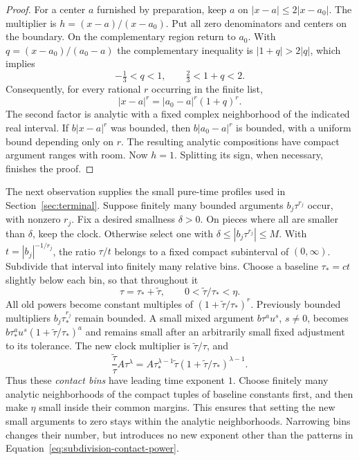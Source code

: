 \begin{proof}
For a center $a$ furnished by preparation, keep $a$ on
$|x-a|\le2|x-a_0|$.  The multiplier is
$h=(x-a)/(x-a_0)$.  Put all zero denominators and centers on the
boundary.  On the complementary region return to $a_0$.  With
$q=(x-a_0)/(a_0-a)$ the complementary inequality is
$|1+q|>2|q|$, which implies
\[
 -\tfrac13<q<1,\qquad \tfrac23<1+q<2.
\]
Consequently, for every rational $r$ occurring in the finite list,
\[
 |x-a|^r=|a_0-a|^r(1+q)^r.
\]
The second factor is analytic with a fixed complex neighborhood of the
indicated real interval.  If $b|x-a|^r$ was bounded, then
$b|a_0-a|^r$ is bounded, with a uniform bound depending only on $r$.
The resulting analytic compositions have compact argument ranges with
room.  Now $h=1$.  Splitting its sign, when necessary, finishes the proof.
\end{proof}

The next observation supplies the small pure-time profiles used in
Section~\ref{sec:terminal}.  Suppose finitely many bounded arguments
$b_j\tau^{r_j}$ occur, with nonzero $r_j$.  Fix a desired smallness
$\delta>0$.  On pieces where all are smaller than $\delta$, keep the
clock.  Otherwise select one with
$\delta\le|b_j\tau^{r_j}|\le M$.  With
$t=|b_j|^{-1/r_j}$, the ratio $\tau/t$ belongs to a fixed compact
subinterval of $(0,\infty)$.  Subdivide that interval into finitely many
relative bins.  Choose a baseline $\tau_*=ct$ slightly below each bin,
so that throughout it
\[
 \tau=\tau_*+\widetilde\tau,\qquad
 0<\widetilde\tau/\tau_*<\eta.
\]
All old powers become constant multiples of
$(1+\widetilde\tau/\tau_*)^r$.
Previously bounded multipliers $b_j\tau_*^{r_j}$ remain bounded.
A small mixed argument $b\tau^a u^s$, $s\ne0$, becomes
$b\tau_*^a u^s(1+\widetilde\tau/\tau_*)^a$ and remains small after
an arbitrarily small fixed adjustment to its tolerance.  The new clock
multiplier is $\widetilde\tau/\tau$, and
\begin{equation}
\label{eq:subdivision-contact-power}
 \frac{\widetilde\tau}{\tau}A\tau^\lambda
 =A\tau_*^{\lambda-1}\widetilde\tau
 (1+\widetilde\tau/\tau_*)^{\lambda-1}.
\end{equation}
Thus these \emph{contact bins} have leading time exponent $1$.
Choose finitely many analytic neighborhoods of the compact tuples of
baseline constants first, and then make $\eta$ small inside their
common margins.  This ensures that setting the new small arguments to
zero stays within the analytic neighborhoods.  Narrowing bins changes
their number, but introduces no new exponent other than the patterns
in Equation~\eqref{eq:subdivision-contact-power}.

